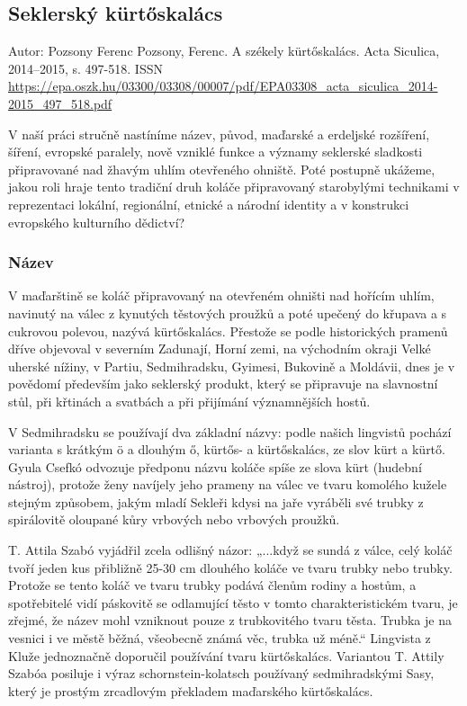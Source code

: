 \subsection{Seklerský
kürtőskalács}\label{250319-1326}

Autor: Pozsony Ferenc Pozsony, Ferenc. A székely kürtőskalács. Acta
Siculica, 2014--2015, s. 497-518. ISSN
\url{https://epa.oszk.hu/03300/03308/00007/pdf/EPA03308_acta_siculica_2014-2015_497_518.pdf}

V naší práci stručně nastíníme název, původ, maďarské a erdeljské
rozšíření, šíření, evropské paralely, nově vzniklé funkce a významy
seklerské sladkosti připravované nad žhavým uhlím otevřeného ohniště.
Poté postupně ukážeme, jakou roli hraje tento tradiční druh koláče
připravovaný starobylými technikami v reprezentaci lokální, regionální,
etnické a národní identity a v konstrukci evropského kulturního
dědictví?

\subsubsection{Název}\label{250319-1326}

V maďarštině se koláč připravovaný na otevřeném ohništi nad hořícím
uhlím, navinutý na válec z kynutých těstových proužků a poté upečený do
křupava a s cukrovou polevou, nazývá kürtőskalács. Přestože se podle
historických pramenů dříve objevoval v severním Zadunají, Horní zemi, na
východním okraji Velké uherské nížiny, v Partiu, Sedmihradsku, Gyimesi,
Bukovině a Moldávii, dnes je v povědomí především jako seklerský
produkt, který se připravuje na slavnostní stůl, při křtinách a svatbách
a při přijímání významnějších hostů.

V Sedmihradsku se používají dva základní názvy: podle našich lingvistů
pochází varianta s krátkým ö a dlouhým ő, kürtős- a kürtőskalács, ze
slov kürt a kürtő. Gyula Csefkó odvozuje předponu názvu koláče spíše ze
slova kürt (hudební nástroj), protože ženy navíjely jeho prameny na
válec ve tvaru komolého kužele stejným způsobem, jakým mladí Sekleři
kdysi na jaře vyráběli své trubky z spirálovitě oloupané kůry vrbových
nebo vrbových proužků.

T. Attila Szabó vyjádřil zcela odlišný názor: „...když se sundá z válce,
celý koláč tvoří jeden kus přibližně 25-30 cm dlouhého koláče ve tvaru
trubky nebo trubky. Protože se tento koláč ve tvaru trubky podává členům
rodiny a hostům, a spotřebitelé vidí páskovitě se odlamující těsto v
tomto charakteristickém tvaru, je zřejmé, že název mohl vzniknout pouze
z trubkovitého tvaru těsta. Trubka je na vesnici i ve městě běžná,
všeobecně známá věc, trubka už méně.`` Lingvista z Kluže jednoznačně
doporučil používání tvaru kürtőskalács. Variantou T. Attily Szabóa
posiluje i výraz schornstein-kolatsch používaný sedmihradskými Sasy,
který je prostým zrcadlovým překladem maďarského kürtőskalács.


